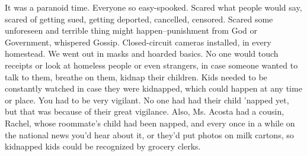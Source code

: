 It was a paranoid time. Everyone so easy-spooked. Scared what people would say, scared of getting sued, getting deported, cancelled, censored. Scared some unforeseen and terrible thing might happen--punishment from God or Government, whispered Gossip. Closed-circuit cameras installed, in every homestead. We went out in masks and hoarded basics. No one would touch receipts or look at homeless people or even strangers, in case someone wanted to talk to them, breathe on them, kidnap their children. Kids needed to be constantly watched in case they were kidnapped, which could happen at any time or place. You had to be very vigilant. No one had had their child 'napped yet, but that was because of their great vigilance. Also, Ms. Acosta had a cousin, Rachel, whose roommate's child had been napped, and every once in a while on the national news you'd hear about it, or they'd put photos on milk cartons, so kidnapped kids could be recognized by grocery clerks. 